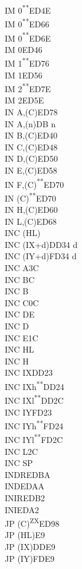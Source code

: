 \documentclass[12pt,twoside,openright,a4paper]{book}
\newcommand{\UNDOC}{\textnormal{\textsuperscript{**}}}
\newcommand{\ZXN}{\textnormal{\textsuperscript{ZX}}}
\begin{document}
\begin{multicols}{3}
{\begin{tabbing}
	IM 0\UNDOC\>ED4E\\
	IM 0\UNDOC\>ED66\\
	IM 0\UNDOC\>ED6E\\
	IM 0\>ED46\\
	IM 1\UNDOC\>ED76\\
	IM 1\>ED56\\
	IM 2\UNDOC\>ED7E\\
	IM 2\>ED5E\\
	IN A,(C)\>ED78\\
	IN A,(n)\>DB n\\
	IN B,(C)\>ED40\\
	IN C,(C)\>ED48\\
	IN D,(C)\>ED50\\
	IN E,(C)\>ED58\\
	IN F,(C)\UNDOC\>ED70\\
	IN (C)\UNDOC\>ED70\\
	IN H,(C)\>ED60\\
	IN L,(C)\>ED68\\
	INC (HL)\\
	INC (IX+d)\>DD34 d\\
	INC (IY+d)\>FD34 d\\
	INC A\>3C\\
	INC BC\\
	INC B\\
	INC C\>0C\\
	INC DE\\
	INC D\\
	INC E\>1C\\
	INC HL\\
	INC H\\
	INC IX\>DD23\\
	INC IXh\UNDOC\>DD24\\
	INC IXl\UNDOC\>DD2C\\
	INC IY\>FD23\\
	INC IYh\UNDOC\>FD24\\
	INC IYl\UNDOC\>FD2C\\
	INC L\>2C\\
	INC SP\\
	INDR\>EDBA\\
	IND\>EDAA\\
	INIR\>EDB2\\
	INI\>EDA2\\
	JP (C)\ZXN\>ED98\\
	JP (HL)\>E9\\
	JP (IX)\>DDE9\\
	JP (IY)\>FDE9\\

\end{tabbing}}
\end{multicols}
\end{document}
